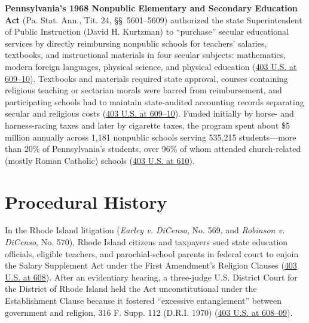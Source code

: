 \documentclass[12pt]{article}
\begin{document}
\textbf{Pennsylvania's 1968 Nonpublic Elementary and Secondary Education Act} (Pa. Stat. Ann., Tit. 24, \S\S~5601--5609) authorized the state Superintendent of Public Instruction (David H. Kurtzman) to ``purchase'' secular educational services by directly reimbursing nonpublic schools for teachers' salaries, textbooks, and instructional materials in four secular subjects: mathematics, modern foreign languages, physical science, and physical education (\href{https://supreme.justia.com/cases/federal/us/403/602/}{403 U.S. at 609--10}). Textbooks and materials required state approval, courses containing religious teaching or sectarian morals were barred from reimbursement, and participating schools had to maintain state-audited accounting records separating secular and religious costs (\href{https://supreme.justia.com/cases/federal/us/403/602/}{403 U.S. at 609--10}). Funded initially by horse- and harness-racing taxes and later by cigarette taxes, the program spent about \$5 million annually across 1,181 nonpublic schools serving 535,215 students---more than 20\% of Pennsylvania's students, over 96\% of whom attended church-related (mostly Roman Catholic) schools (\href{https://supreme.justia.com/cases/federal/us/403/602/}{403 U.S. at 610}).

\section{Procedural History}
In the Rhode Island litigation (\textit{Earley v. DiCenso}, No. 569, and \textit{Robinson v. DiCenso}, No. 570), Rhode Island citizens and taxpayers sued state education officials, eligible teachers, and parochial-school parents in federal court to enjoin the Salary Supplement Act under the First Amendment's Religion Clauses (\href{https://supreme.justia.com/cases/federal/us/403/602/}{403 U.S. at 608}). After an evidentiary hearing, a three-judge U.S. District Court for the District of Rhode Island held the Act unconstitutional under the Establishment Clause because it fostered ``excessive entanglement'' between government and religion, 316 F. Supp. 112 (D.R.I. 1970) (\href{https://supreme.justia.com/cases/federal/us/403/602/}{403 U.S. at 608--09}).
\end{document}

